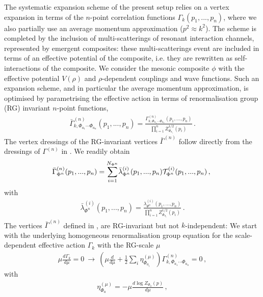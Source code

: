 \documentclass[aps,twocolumn,prd,superscriptaddress]{revtex4-2}
\begin{document}
The systematic expansion scheme of the present setup relies on a vertex expansion in terms of the $n$-point correlation functions $\Gamma_k(p_1,...,p_n)$, where we also partially use an average momentum approximation ($p^2 \approx k^2$). 
The scheme is completed by the inclusion of multi-scatterings of resonant interaction channels, represented by emergent composites: these multi-scatterings event are included in terms of an effective potential of the composite, i.e. they are rewritten as self-interactions of the composite. We consider the mesonic composite $\phi$ with the effective potential $V(\rho)$ and $\rho$-dependent couplings and wave functions. Such an expansion scheme, and in particular the average momentum approximation, is optimised by parametrising the effective action in terms of renormalisation group (RG) invariant $n$-point functions, 
%
\begin{align}
	\bar\Gamma^{(n)}_{k,\Phi_{a_1} \cdots \Phi_{a_n}}(p_1,...,p_n)= 
	\frac{\Gamma_{k,\Phi_{a_1} \cdots \Phi_{a_n}}^{(n)}(p_1,...,p_n)}{\prod_{i=1}^n Z^{1/2}_{\Phi_{a_i}}(p_i)}\,.
	\label{eq:RGinvGn}
\end{align}
%
The vertex dressings of the RG-invariant vertices $\bar\Gamma^{(n)}$ follow directly from the dressings of $\Gamma^{(n)}$ in . We readily obtain 
%
\begin{align}
	\hspace{-.1cm}\bar \Gamma_{\Phi^n}^{(n)}(p_1,...,p_n) = \sum_{i=1}^{N_{\Phi^n}}\!  \bar \lambda_{\Phi^n}^{(i)}(p_1,...,p_n) {\cal T}^{(i)}_{\Phi^n}(p_1,...,p_n)\,,
	\label{eq:CompleteBasisGnRGinv}
\end{align}
%
with 
%
\begin{align} 
	\bar \lambda_{\Phi^n}^{(i)}(p_1,...,p_n) = \frac{ \lambda_{\Phi^n}^{(i)}(p_1,...,p_n)} {\prod_{i=1}^n Z^{1/2}_{\Phi_{a_i}}(p_i)}\,.
\label{eq:barlambda}
\end{align}
%
The vertices $\bar\Gamma^{(n)}$ defined in , are RG-invariant but not $k$-independent: We start with the underlying homogeneous renormalisation group equation for the scale-dependent effective action $\Gamma_k$ with the RG-scale $\mu$
%
\begin{align} 
\mu\frac{d \Gamma_k}{d \mu}=0\  \longrightarrow\  \left( \mu\frac{d}{d \mu} + \frac12 \sum_i \eta_{\Phi_{a_i}}^{(\mu)}\right)   \Gamma^{(n)}_{k,\Phi_{a_1} \cdots \Phi_{a_n}} =0\,, 
\label{eq:RGmu}
\end{align}
%
with 
%
\begin{align} 
\eta_{\Phi_a}^{(\mu)}= - \mu\frac{d \log Z_{\Phi_a}(p)}{d \mu} \,, 
	\label{eq:etamu}
\end{align}
\end{document}
